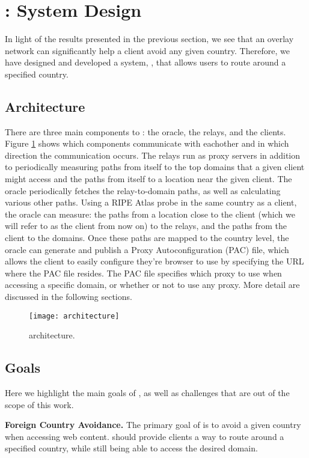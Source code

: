 \section{\system{}: System Design}
In light of the results presented in the previous section, we see that an 
overlay network can significantly help a client avoid any given country.  
Therefore, we have designed and developed a system, \system{}, that allows users 
to route around a specified country.

\subsection{Architecture}

There are three main components to \system{}: the oracle, the relays, and the 
clients.  Figure \ref{fig:arch} shows which components communicate with 
eachother and in which direction the communication occurs.  The relays run as 
proxy servers in addition to periodically measuring paths from itself to the 
top domains that a given client might access and the paths from itself to a 
location near the given client.  The oracle periodically fetches the 
relay-to-domain paths, as well as calculating various other paths.  Using a RIPE
 Atlas probe in the same country as a client, the oracle can measure: the paths
 from a location close to the client (which we will refer to as the client from 
now on) to the relays, and the paths from the client to the domains.  Once these
 paths are mapped to the country level, the oracle can generate and publish a 
Proxy Autoconfiguration (PAC) file, which allows the client to easily configure 
they're browser to use \system{} by specifying the URL where the PAC file resides.
  The PAC file specifies which proxy to use when accessing a specific domain, 
or whether or not to use any proxy.  More detail are discussed in the following 
sections.

\begin{figure}[t]
\centering
\texttt{[image: architecture]}
\caption{\system{} architecture.}
\label{fig:arch}
\end{figure}

\subsection{Goals}
Here we highlight the main goals of \system{}, as well as challenges that are out 
of the scope of this work.

{\bf Foreign Country Avoidance.}  The primary goal of \system{} is to avoid a given
 country when accessing web content.  \system{} should provide clients a way to 
route around a specified country, while still being able to access the desired 
domain.

